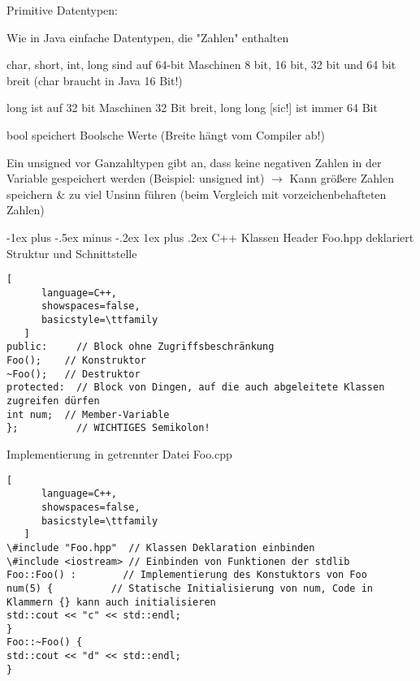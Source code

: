 \documentclass[10pt]{article}
\makeatletter
\renewcommand{\subsubsection}{\@startsection{subsubsection}{3}{0mm}%
                                {-1ex plus -.5ex minus -.2ex}%
                                {1ex plus .2ex}%
                                {\normalfont\small\bfseries}}
\makeatother
\begin{document}
\begin{itemize*}
\begin{itemize*}
\begin{itemize*}
    \end{itemize*}
  \end{itemize*}
  \item Primitive Datentypen:
  \begin{itemize*}
    \item Wie in Java einfache Datentypen, die "Zahlen" enthalten
    \item char, short, int, long sind auf 64-bit Maschinen 8 bit, 16 bit, 32 bit und 64 bit breit (char braucht in Java 16 Bit!)
    \item long ist auf 32 bit Maschinen 32 Bit breit, long long [sic!] ist immer 64 Bit
    \item bool speichert Boolsche Werte (Breite hängt vom Compiler ab!)
    \item Ein unsigned vor Ganzahltypen gibt an, dass keine negativen Zahlen in der Variable gespeichert werden (Beispiel: unsigned int) $\rightarrow$ Kann größere Zahlen speichern \& zu viel Unsinn führen (beim Vergleich mit vorzeichenbehafteten Zahlen)
  \end{itemize*}
\end{itemize*}

\subsubsection{C++ Klassen}
Header Foo.hpp deklariert Struktur und Schnittstelle
\begin{lstlisting}[
      language=C++,
      showspaces=false,
      basicstyle=\ttfamily
   ]
public:     // Block ohne Zugriffsbeschränkung
Foo();    // Konstruktor
~Foo();   // Destruktor
protected:  // Block von Dingen, auf die auch abgeleitete Klassen zugreifen dürfen
int num;  // Member-Variable
};          // WICHTIGES Semikolon!
\end{lstlisting}


Implementierung in getrennter Datei Foo.cpp
\begin{lstlisting}[
      language=C++,
      showspaces=false,
      basicstyle=\ttfamily
   ]
\#include "Foo.hpp"  // Klassen Deklaration einbinden
\#include <iostream> // Einbinden von Funktionen der stdlib
Foo::Foo() :        // Implementierung des Konstuktors von Foo
num(5) {          // Statische Initialisierung von num, Code in Klammern {} kann auch initialisieren
std::cout << "c" << std::endl;
}
Foo::~Foo() {
std::cout << "d" << std::endl;
}
\end{lstlisting}
\end{document}
